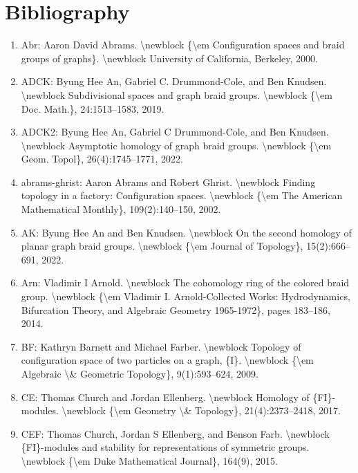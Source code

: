 \documentclass[11pt]{article}
\begin{document}
\section*{Bibliography}
\begin{enumerate}[leftmargin=*]
  \item Abr: Aaron David Abrams. \textbackslash{}newblock \{\textbackslash{}em Configuration spaces and braid groups of graphs\}. \textbackslash{}newblock University of California, Berkeley, 2000.
  \item ADCK: Byung Hee An, Gabriel C. Drummond-Cole, and Ben Knudsen. \textbackslash{}newblock Subdivisional spaces and graph braid groups. \textbackslash{}newblock \{\textbackslash{}em Doc. Math.\}, 24:1513--1583, 2019.
  \item ADCK2: Byung Hee An, Gabriel C Drummond-Cole, and Ben Knudsen. \textbackslash{}newblock Asymptotic homology of graph braid groups. \textbackslash{}newblock \{\textbackslash{}em Geom. Topol\}, 26(4):1745--1771, 2022.
  \item abrams-ghrist: Aaron Abrams and Robert Ghrist. \textbackslash{}newblock Finding topology in a factory: Configuration spaces. \textbackslash{}newblock \{\textbackslash{}em The American Mathematical Monthly\}, 109(2):140--150, 2002.
  \item AK: Byung Hee An and Ben Knudsen. \textbackslash{}newblock On the second homology of planar graph braid groups. \textbackslash{}newblock \{\textbackslash{}em Journal of Topology\}, 15(2):666--691, 2022.
  \item Arn: Vladimir I Arnold. \textbackslash{}newblock The cohomology ring of the colored braid group. \textbackslash{}newblock \{\textbackslash{}em Vladimir I. Arnold-Collected Works: Hydrodynamics, Bifurcation Theory, and Algebraic Geometry 1965-1972\}, pages 183--186, 2014.
  \item BF: Kathryn Barnett and Michael Farber. \textbackslash{}newblock Topology of configuration space of two particles on a graph, \{I\}. \textbackslash{}newblock \{\textbackslash{}em Algebraic \textbackslash{}\& Geometric Topology\}, 9(1):593--624, 2009.
  \item CE: Thomas Church and Jordan Ellenberg. \textbackslash{}newblock Homology of \{FI\}-modules. \textbackslash{}newblock \{\textbackslash{}em Geometry \textbackslash{}\& Topology\}, 21(4):2373--2418, 2017.
  \item CEF: Thomas Church, Jordan S Ellenberg, and Benson Farb. \textbackslash{}newblock \{FI\}-modules and stability for representations of symmetric groups. \textbackslash{}newblock \{\textbackslash{}em Duke Mathematical Journal\}, 164(9), 2015.

\end{enumerate}
\end{document}

